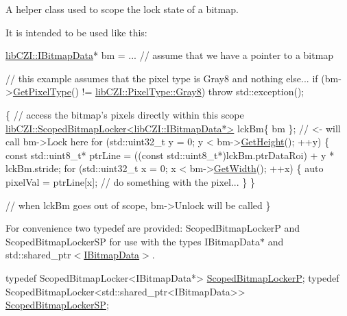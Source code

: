 A helper class used to scope the lock state of a bitmap.

It is intended to be used like this\+: 
\begin{DoxyCode}
\hyperlink{classlib_c_z_i_1_1_i_bitmap_data}{libCZI::IBitmapData}* bm = ... \textcolor{comment}{// assume that we have a pointer to a bitmap}

\textcolor{comment}{// this example assumes that the pixel type is Gray8 and nothing else...}
\textcolor{keywordflow}{if} (bm->\hyperlink{classlib_c_z_i_1_1_i_bitmap_data_a66f27266674d7f328dd5f1270b81a94e}{GetPixelType}() != \hyperlink{namespacelib_c_z_i_abf8ce12ab88b06c8b3b47efbb5e2e834ac8cfe3d00282445878661f32adca48ef}{libCZI::PixelType::Gray8}) \textcolor{keywordflow}{throw} 
      std::exception();

\{
    \textcolor{comment}{// access the bitmap's pixels directly within this scope}
    \hyperlink{classlib_c_z_i_1_1_scoped_bitmap_locker}{libCZI::ScopedBitmapLocker<libCZI::IBitmapData*>} lckBm\{
       bm \};   \textcolor{comment}{// <- will call bm->Lock here}
    \textcolor{keywordflow}{for} (std::uint32\_t y  = 0; y < bm->\hyperlink{classlib_c_z_i_1_1_i_bitmap_data_a2072b5c8db493b7b19717811a96a6483}{GetHeight}(); ++y)
    \{
        \textcolor{keyword}{const} std::uint8\_t* ptrLine = ((\textcolor{keyword}{const} std::uint8\_t*)lckBm.ptrDataRoi) + y * lckBm.stride;
        \textcolor{keywordflow}{for} (std::uint32\_t x  = 0; x < bm->\hyperlink{classlib_c_z_i_1_1_i_bitmap_data_aa2638991a88c736ff4e6c42dc4c6c5c7}{GetWidth}(); ++x)
        \{
            \textcolor{keyword}{auto} pixelVal = ptrLine[x];
            \textcolor{comment}{// do something with the pixel...}
        \}
    \}
    
    \textcolor{comment}{// when lckBm goes out of scope, bm->Unlock will be called}
 \}
\end{DoxyCode}


For convenience two typedef are provided\+: {\ttfamily Scoped\+Bitmap\+LockerP} and {\ttfamily Scoped\+Bitmap\+Locker\+SP} for use with the types {\ttfamily I\+Bitmap\+Data$\ast$} and {\ttfamily std\+::shared\+\_\+ptr$<$\hyperlink{classlib_c_z_i_1_1_i_bitmap_data}{I\+Bitmap\+Data}$>$}.


\begin{DoxyCode}
\textcolor{keyword}{typedef} ScopedBitmapLocker<IBitmapData*> \hyperlink{namespacelib_c_z_i_aa0a4df11f476d960267cc3757d7e889d}{ScopedBitmapLockerP};
\textcolor{keyword}{typedef} ScopedBitmapLocker<std::shared\_ptr<IBitmapData>> \hyperlink{namespacelib_c_z_i_a44eca12300534095278df46d8b7ef824}{ScopedBitmapLockerSP};
\end{DoxyCode}


